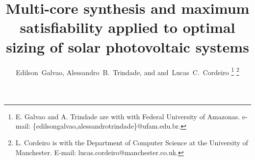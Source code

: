 \documentclass[journal]{IEEEtran}
\begin{document}
%
\title{Multi-core synthesis and maximum satisfiability applied to optimal sizing of solar photovoltaic systems}
%
%
%

\author{Edilson~Galvao,%
         Alessandro~B.~Trindade, and%
        and~Lucas~C.~Cordeiro%
\thanks{E. Galvao and A. Trindade are with with Federal University of Amazonas. e-mail: \{edilsongalvao,alessandrotrindade\}@ufam.edu.br.}%
\thanks{L. Cordeiro is with the Department of Computer Science at the University of Manchester. E-mail: lucas.cordeiro@manchester.co.uk.}%
}

% 
%
\end{document}
